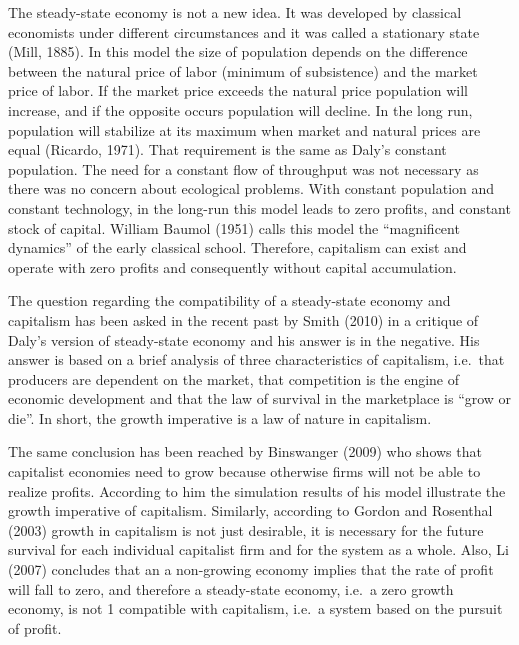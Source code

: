 \documentclass[
]{book}
\begin{document}
The steady-state economy is not a new idea. It was developed by classical economists under
different circumstances and it was called a stationary state (Mill, 1885). In this model the size
of population depends on the difference between the natural price of labor (minimum of
subsistence) and the market price of labor. If the market price exceeds the natural price
population will increase, and if the opposite occurs population will decline. In the long run,
population will stabilize at its maximum when market and natural prices are equal (Ricardo,
1971). That requirement is the same as Daly's constant population. The need for a constant
flow of throughput was not necessary as there was no concern about ecological problems.
With constant population and constant technology, in the long-run this model leads to zero
profits, and constant stock of capital. William Baumol (1951) calls this model the ``magnificent
dynamics'' of the early classical school. Therefore, capitalism can exist and operate with zero
profits and consequently without capital accumulation.

The question regarding the compatibility of a steady-state economy and capitalism has been
asked in the recent past by Smith (2010) in a critique of Daly's version of steady-state
economy and his answer is in the negative. His answer is based on a brief analysis of three
characteristics of capitalism, i.e.~that producers are dependent on the market, that competition
is the engine of economic development and that the law of survival in the marketplace is
``grow or die''. In short, the growth imperative is a law of nature in capitalism.

The same conclusion has been reached by Binswanger (2009) who shows that capitalist
economies need to grow because otherwise firms will not be able to realize profits. According
to him the simulation results of his model illustrate the growth imperative of capitalism.
Similarly, according to Gordon and Rosenthal (2003) growth in capitalism is not just desirable,
it is necessary for the future survival for each individual capitalist firm and for the system as a
whole. Also, Li (2007) concludes that an a non-growing economy implies that the rate of profit
will fall to zero, and therefore a steady-state economy, i.e.~a zero growth economy, is not
1
compatible with capitalism, i.e.~a system based on the pursuit of profit.
\end{document}
